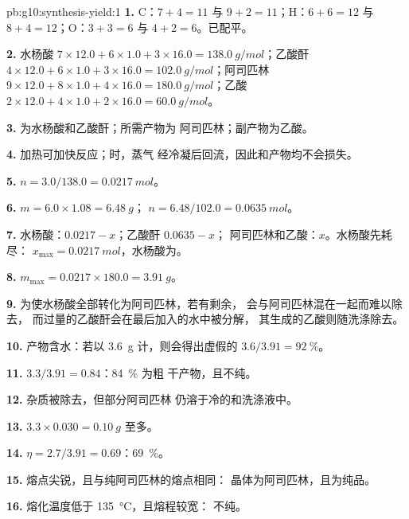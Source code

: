 \begin{solution}{pb:g10:synthesis-yield:1}
\textbf{1.} C：$7 + 4 = 11$ 与 $9 + 2 = 11$；H：$6 + 6 = 12$ 与
$8 + 4 = 12$；O：$3 + 3 = 6$ 与 $4 + 2 = 6$。已配平。

\textbf{2.} 水杨酸 $7 \times 12.0 + 6 \times 1.0 + 3 \times 16.0
= \qty{138.0}{g/mol}$；乙酸酐 $4 \times 12.0 + 6 \times 1.0 +
3 \times 16.0 = \qty{102.0}{g/mol}$；阿司匹林 $9 \times 12.0 + 8 \times
1.0 + 4 \times 16.0 = \qty{180.0}{g/mol}$；乙酸 $2 \times 12.0
+ 4 \times 1.0 + 2 \times 16.0 = \qty{60.0}{g/mol}$。

\textbf{3.} 为水杨酸和乙酸酐；所需产物为
阿司匹林；副产物为乙酸。

\textbf{4.} 加热可加快反应；时，蒸气
经冷凝后回流，因此和产物均不会损失。

\textbf{5.} $n = 3.0 / 138.0 = \qty{0.0217}{mol}$。

\textbf{6.} $m = 6.0 \times 1.08 = \qty{6.48}{g}$；
$n = 6.48 / 102.0 = \qty{0.0635}{mol}$。

\textbf{7.} 水杨酸：$0.0217 - x$；乙酸酐 $0.0635 - x$；
阿司匹林和乙酸：$x$。水杨酸先耗尽：
$x_{\max} = \qty{0.0217}{mol}$，水杨酸为。

\textbf{8.} $m_{\max} = 0.0217 \times 180.0 = \qty{3.91}{g}$。

\textbf{9.} 为使水杨酸全部转化为阿司匹林，若有剩余，
会与阿司匹林混在一起而难以除去，
而过量的乙酸酐会在最后加入的水中被分解，
其生成的乙酸则随洗涤除去。

\textbf{10.} 产物含水：若以 \qty{3.6}{g} 计，则会得出虚假的
$3.6 / 3.91 = \qty{92}{\percent}$。

\textbf{11.} $3.3 / 3.91 = 0.84$：\qty{84}{\percent} 为粗
干产物，且不纯。

\textbf{12.} 杂质被除去，但部分阿司匹林
仍溶于冷的和洗涤液中。

\textbf{13.} $3.3 \times 0.030 = \qty{0.10}{g}$ 至多。

\textbf{14.} $\eta = 2.7 / 3.91 = 0.69$：\qty{69}{\percent}。

\textbf{15.} 熔点尖锐，且与纯阿司匹林的熔点相同：
晶体为阿司匹林，且为纯品。

\textbf{16.} 熔化温度低于 \qty{135}{\celsius}，且熔程较宽：
不纯。


\end{solution}
